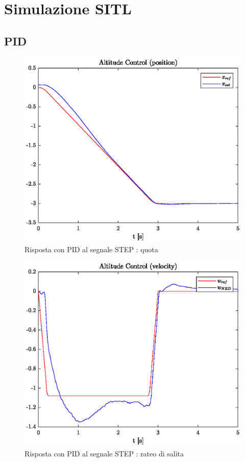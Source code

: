 \section{Simulazione SITL}
\subsection{PID}

\begin{figure}
	\centering
	\includegraphics[width=1\textwidth]{Simulazioni/Figure/STEPaltitudecontrolpos}
	\caption{Risposta con PID al segnale STEP : quota}
\end{figure}

\begin{figure}
	\centering
	\includegraphics[width=1\textwidth]{Simulazioni/Figure/STEPaltitudecontrolvel}
	\caption{Risposta con PID al segnale STEP : rateo di salita}
\end{figure}

